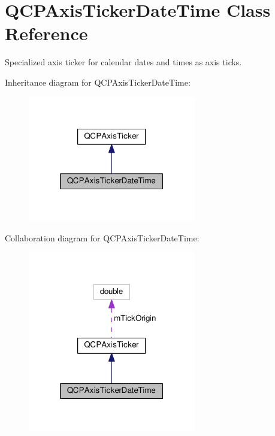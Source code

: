 \hypertarget{classQCPAxisTickerDateTime}{}\section{Q\+C\+P\+Axis\+Ticker\+Date\+Time Class Reference}
\label{classQCPAxisTickerDateTime}


Specialized axis ticker for calendar dates and times as axis ticks.  




Inheritance diagram for Q\+C\+P\+Axis\+Ticker\+Date\+Time\+:
\nopagebreak
\begin{figure}[H]
\begin{center}
\leavevmode
\includegraphics[width=208pt]{classQCPAxisTickerDateTime__inherit__graph}
\end{center}
\end{figure}


Collaboration diagram for Q\+C\+P\+Axis\+Ticker\+Date\+Time\+:
\nopagebreak
\begin{figure}[H]
\begin{center}
\leavevmode
\includegraphics[width=208pt]{classQCPAxisTickerDateTime__coll__graph}
\end{center}
\end{figure}
